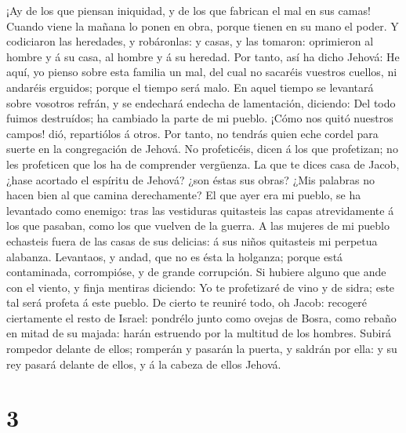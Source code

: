  ¡Ay de los que piensan iniquidad, y de los que fabrican
el mal en sus camas! Cuando viene la mañana lo ponen en obra, porque
tienen en su mano el poder.  Y codiciaron las heredades, y
robáronlas: y casas, y las tomaron: oprimieron al hombre y á su casa, al
hombre y á su heredad.  Por tanto, así ha dicho Jehová: He
aquí, yo pienso sobre esta familia un mal, del cual no sacaréis vuestros
cuellos, ni andaréis erguidos; porque el tiempo será malo.
 En aquel tiempo se levantará sobre vosotros refrán, y se
endechará endecha de lamentación, diciendo: Del todo fuimos destruídos;
ha cambiado la parte de mi pueblo. ¡Cómo nos quitó nuestros campos! dió,
repartiólos á otros.  Por tanto, no tendrás quien eche
cordel para suerte en la congregación de Jehová.  No
profeticéis, dicen á los que profetizan; no les profeticen que los ha de
comprender vergüenza.  La que te dices casa de Jacob,
¿hase acortado el espíritu de Jehová? ¿son éstas sus obras? ¿Mis
palabras no hacen bien al que camina derechamente?  El que
ayer era mi pueblo, se ha levantado como enemigo: tras las vestiduras
quitasteis las capas atrevidamente á los que pasaban, como los que
vuelven de la guerra.  A las mujeres de mi pueblo
echasteis fuera de las casas de sus delicias: á sus niños quitasteis mi
perpetua alabanza.  Levantaos, y andad, que no es ésta la
holganza; porque está contaminada, corrompióse, y de grande corrupción.
 Si hubiere alguno que ande con el viento, y finja
mentiras diciendo: Yo te profetizaré de vino y de sidra; este tal será
profeta á este pueblo.  De cierto te reuniré todo, oh
Jacob: recogeré ciertamente el resto de Israel: pondrélo junto como
ovejas de Bosra, como rebaño en mitad de su majada: harán estruendo por
la multitud de los hombres.  Subirá rompedor delante de
ellos; romperán y pasarán la puerta, y saldrán por ella: y su rey pasará
delante de ellos, y á la cabeza de ellos Jehová.

\hypertarget{section-2}{%
\section{3}\label{section-2}}

